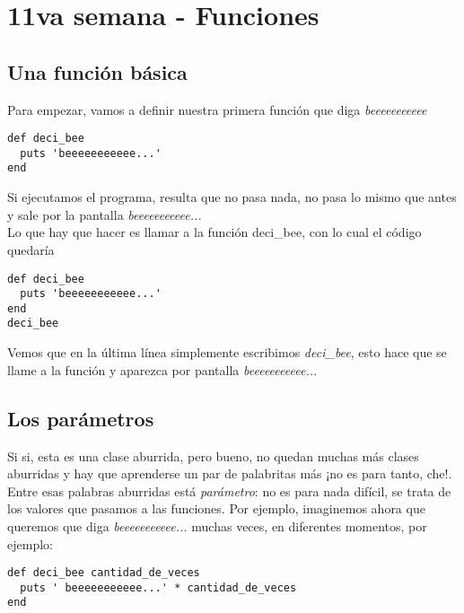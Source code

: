 \chapter{11va semana - Funciones}



\section{Una función básica}
Para empezar, vamos a definir nuestra primera función que diga \emph{beeeeeeeeeee}

\begin{lstlisting}
def deci_bee
  puts 'beeeeeeeeeee...'
end
\end{lstlisting}

Si ejecutamos el programa, resulta que no pasa nada, no pasa lo mismo que antes y sale por la pantalla \emph{beeeeeeeeeee...}\\

Lo que hay que hacer es llamar a la función deci\_bee, con lo cual el código quedaría
\begin{lstlisting}
def deci_bee
  puts 'beeeeeeeeeee...'
end
deci_bee
\end{lstlisting}
Vemos que en la última línea simplemente escribimos \emph{deci\_bee}, esto hace que se llame a la función y aparezca por pantalla \emph{beeeeeeeeeee...}

\section{Los parámetros}
Si si, esta es una clase aburrida, pero bueno, no quedan muchas más clases aburridas y hay que aprenderse un par de palabritas más ¡no es para tanto, che!. Entre esas palabras aburridas está \emph{parámetro}: no es para nada difícil, se trata de los valores que pasamos a las funciones. Por ejemplo, imaginemos ahora que queremos que diga \emph{beeeeeeeeeee...} muchas veces, en diferentes momentos, por ejemplo:
\begin{lstlisting}
def deci_bee cantidad_de_veces
  puts ' beeeeeeeeeee...' * cantidad_de_veces
end
\end{lstlisting}

